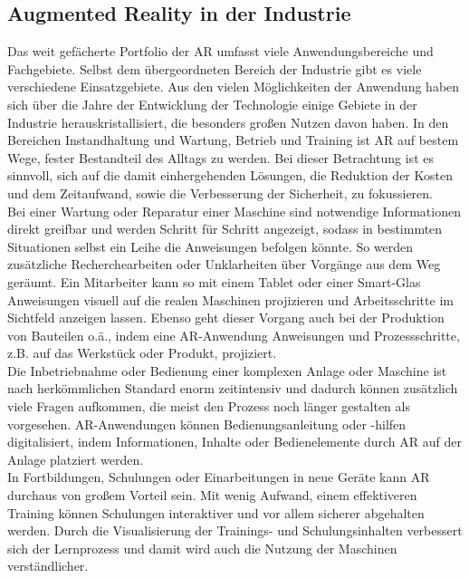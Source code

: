 \subsection{Augmented Reality in der Industrie}
\label{sec:ARIndustrie}
Das weit gefächerte Portfolio der \acl{AR} umfasst viele Anwendungsbereiche und Fachgebiete. Selbst dem übergeordneten Bereich der Industrie 
gibt es viele verschiedene Einsatzgebiete. Aus den vielen Möglichkeiten der Anwendung haben sich über die Jahre der Entwicklung der Technologie 
einige Gebiete in der Industrie herauskristallisiert, die besonders großen Nutzen davon haben. \cite{einsatzgebietear.2017a} In den Bereichen 
Instandhaltung und Wartung, Betrieb und Training ist \acl{AR} auf bestem Wege, fester Bestandteil des Alltags zu werden. Bei dieser Betrachtung 
ist es sinnvoll, sich auf die damit einhergehenden Lösungen, die Reduktion der Kosten und dem Zeitaufwand, sowie die Verbesserung 
der Sicherheit, zu fokussieren. \cite{studieptc.2020j} 
\\ 
\linebreak
Bei einer Wartung oder Reparatur einer Maschine sind notwendige Informationen direkt greifbar und werden Schritt für Schritt angezeigt, sodass 
in bestimmten Situationen selbst ein Leihe die Anweisungen befolgen könnte. So werden zusätzliche Recherchearbeiten oder Unklarheiten über 
Vorgänge aus dem Weg geräumt. Ein Mitarbeiter kann so mit einem Tablet oder einer Smart-Glas Anweisungen visuell auf die realen Maschinen 
projizieren und Arbeitsschritte im Sichtfeld anzeigen lassen. Ebenso geht dieser Vorgang auch bei der Produktion von Bauteilen o.ä., indem 
eine \acs{AR}-Anwendung Anweisungen und Prozessschritte, z.B. auf das Werkstück oder Produkt, projiziert.
\\ 
Die Inbetriebnahme oder Bedienung einer komplexen Anlage oder Maschine ist nach herkömmlichen Standard enorm zeitintensiv und dadurch können
zusätzlich viele Fragen aufkommen, die meist den Prozess noch länger gestalten als vorgesehen. \acs{AR}-Anwendungen können 
Bedienungsanleitung oder -hilfen digitalisiert, indem Informationen, Inhalte oder Bedienelemente durch \acl{AR} auf der Anlage platziert werden. 
\\ 
In Fortbildungen, Schulungen oder Einarbeitungen in neue Geräte kann \acs{AR} durchaus von großem Vorteil sein. Mit wenig Aufwand, einem 
effektiveren Training können Schulungen interaktiver und vor allem sicherer abgehalten werden. Durch die Visualisierung der Trainings- und 
Schulungsinhalten verbessert sich der Lernprozess und damit wird auch die Nutzung der Maschinen verständlicher. \cite{einsatzgebietear.2017a}